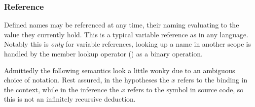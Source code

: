 \subsubsection{Reference}

Defined names may be referenced at any time, their naming evaluating to the value
they currently hold. This is a typical variable reference as in any language.
Notably this is \emph{only} for variable references, looking up a name in another
scope is handled by the member lookup operator () as a binary operation.

\begin{bnf*}
\end{bnf*}

Admittedly the following semantics look a little wonky due to an ambiguous choice
of notation. Rest assured, in the hypotheses the $x$ refers to the binding in the
context, while in the inference the $x$ refers to the symbol in source code, so
this is not an infinitely recursive deduction.

\begin{prooftree}
\end{prooftree}
